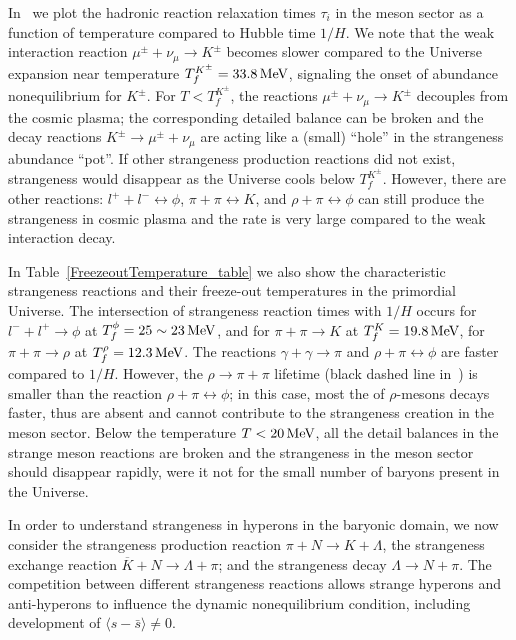 In~ we plot the hadronic reaction relaxation times $\tau_{i}$ in the meson sector as a function of temperature compared to Hubble time $1/H$. We note that the weak interaction reaction $\mu^\pm+\nu_{\mu}\rightarrow K^\pm$ becomes slower compared to the Universe expansion near temperature $T_f^{K^\pm}=33.8\text{\,MeV}$, signaling the onset of abundance nonequilibrium for $K^\pm$. For $T<T_f^{K^\pm}$, the reactions $\mu^\pm+\nu_{\mu}\rightarrow K^\pm$ decouples from the cosmic plasma; the corresponding detailed balance can be broken and the decay reactions $K^\pm\rightarrow\mu^\pm+\nu_{\mu}$ are acting like a (small) ``hole'' in the strangeness abundance ``pot''. If other strangeness production reactions did not exist, strangeness would disappear as the Universe cools below $T_f^{K^\pm}$. However, there are other reactions: $l^++l^-\leftrightarrow\phi$, $\pi+\pi\leftrightarrow K$, and $\rho+\pi\leftrightarrow\phi$ can still produce the strangeness in cosmic plasma and the rate is very large compared to the weak interaction decay.

In Table~\ref{FreezeoutTemperature_table} we also show the characteristic strangeness reactions and their freeze-out temperatures in the primordial Universe. The intersection of strangeness reaction times with $1/H$ occurs for $l^-+l^+\rightarrow\phi$ at $T_f^\phi=25\sim23\text{\,MeV}$, and for $\pi+\pi\rightarrow K$ at $T_f^K=19.8\text{\,MeV}$, for $\pi+\pi\rightarrow\rho$ at $T_f^\rho=12.3\text{\,MeV}$. The reactions $\gamma+\gamma\rightarrow\pi$ and $\rho+\pi\leftrightarrow\phi$ are faster compared to $1/H$. However, the $\rho\to\pi+\pi$ lifetime (black dashed line in~) is smaller than the reaction $\rho+\pi\leftrightarrow\phi$; in this case, most the of $\rho$-mesons decays faster, thus are absent and cannot contribute to the strangeness creation in the meson sector. Below the temperature $T<20\text{\,MeV}$, all the detail balances in the strange meson reactions are broken and the strangeness in the meson sector should disappear rapidly, were it not for the small number of baryons present in the Universe.

In order to understand strangeness in hyperons in the baryonic domain, we now consider the strangeness production reaction $\pi +N\rightarrow K+\Lambda$, the strangeness exchange reaction $\overline{K}+N\rightarrow \Lambda+\pi$; and the strangeness decay $\Lambda\rightarrow N+\pi$. The competition between different strangeness reactions allows strange hyperons and anti-hyperons to influence the dynamic nonequilibrium condition, including development of $\langle s-\bar s\rangle \ne 0$.

